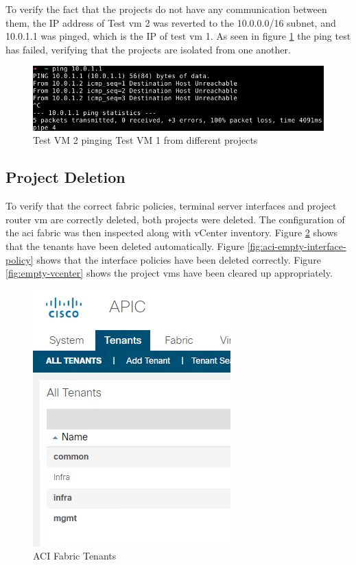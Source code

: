 To verify the fact that the projects do not have any communication between them, the IP address of Test \gls{vm} 2 was reverted to the 10.0.0.0/16 subnet, and 10.0.1.1 was pinged, which is the IP of test \gls{vm} 1. As seen in figure \ref{fig:inter-project-communication} the ping test has failed, verifying that the projects are isolated from one another.

\begin{figure}[H]
    \centering
    \includegraphics[scale=1.2]{images/inter-project-communication.png}
    \caption{Test VM 2 pinging Test VM 1 from different projects}
    \label{fig:inter-project-communication}
\end{figure}

\subsection{Project Deletion}
To verify that the correct fabric policies, terminal server interfaces and project router \gls{vm} are correctly deleted, both projects were deleted. The configuration of the \gls{aci} fabric was then inspected along with vCenter inventory. Figure \ref{fig:aci-empty-tenants} shows that the tenants have been deleted automatically. Figure \ref{fig:aci-empty-interface-policy} shows that the interface policies have been deleted correctly. Figure \ref{fig:empty-vcenter} shows the project \gls{vm}s have been cleared up appropriately.


\begin{figure}[H]
    \centering
    \includegraphics[scale=1.2]{images/aci-empty-tenants.png}
    \caption{ACI Fabric Tenants}
    \label{fig:aci-empty-tenants}
\end{figure}

